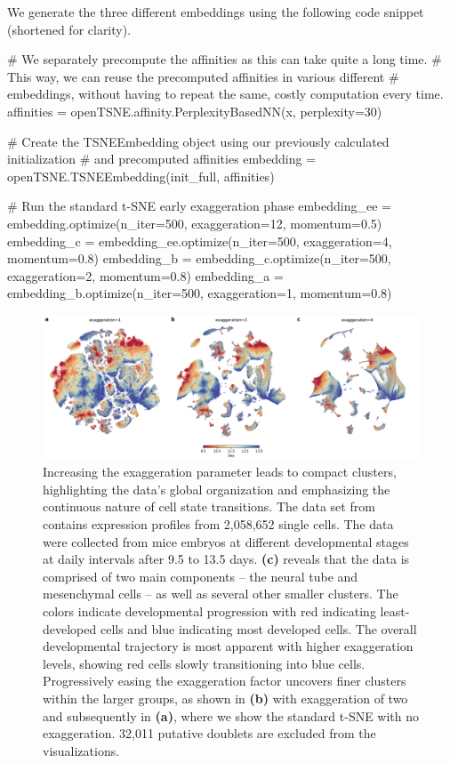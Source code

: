 \documentclass[article]{jss}
\begin{document}
We generate the three different embeddings using the following code snippet
(shortened for clarity).
\begin{CodeChunk}
\begin{CodeInput}
# We separately precompute the affinities as this can take quite a long time.
# This way, we can reuse the precomputed affinities in various different
# embeddings, without having to repeat the same, costly computation every time.
affinities = openTSNE.affinity.PerplexityBasedNN(x, perplexity=30)

# Create the TSNEEmbedding object using our previously calculated initialization
# and precomputed affinities
embedding = openTSNE.TSNEEmbedding(init_full, affinities)

# Run the standard t-SNE early exaggeration phase
embedding_ee =    embedding.optimize(n_iter=500, exaggeration=12, momentum=0.5)
embedding_c  = embedding_ee.optimize(n_iter=500, exaggeration=4,  momentum=0.8)
embedding_b  =  embedding_c.optimize(n_iter=500, exaggeration=2,  momentum=0.8)
embedding_a  =  embedding_b.optimize(n_iter=500, exaggeration=1,  momentum=0.8)
\end{CodeInput}
\end{CodeChunk}

\begin{figure}[htbp]
  \includegraphics[width=\textwidth]{cao2019}
  \caption{\label{fig:cao}
  Increasing the exaggeration parameter leads to compact clusters, highlighting
  the data's global organization and emphasizing the continuous nature of
  cell state transitions. The data set from \citet{cao2019single}
  contains expression profiles from 2,058,652 single cells. The data were
  collected from mice embryos at different developmental stages at daily
  intervals after 9.5 to 13.5 days. \textbf{(c)} reveals that the data is
  comprised of two main components -- the neural tube and mesenchymal
  cells -- as well as several other smaller clusters. The
  colors indicate developmental progression with red indicating
  least-developed cells and blue indicating most developed cells. The
  overall developmental trajectory is most apparent with higher
  exaggeration levels, showing red cells slowly transitioning into blue
  cells. Progressively easing the exaggeration factor uncovers finer
  clusters within the larger groups, as shown in \textbf{(b)} with
  exaggeration of two and subsequently in \textbf{(a)}, where we show the
  standard t-SNE with no exaggeration. 32,011 putative doublets are
  excluded from the visualizations.
}
\end{figure}
\end{document}
